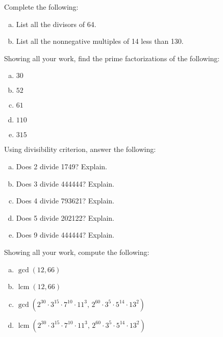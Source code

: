 \documentclass[11pt,letterpaper]{article}
\DeclareMathOperator{\lcm}{lcm}
\begin{document}

 Complete the following:
	\begin{enumerate}[(a)]
	\item List all the divisors of 64.
	\item List all the nonnegative multiples of 14 less than 130. 
	\end{enumerate}



\newpage



 Showing all your work, find the prime factorizations of the following:
	\begin{enumerate}[(a)]
	\item $30$
	\item $52$
	\item $61$
	\item $110$
	\item $315$
	\end{enumerate}



\newpage



 Using divisibility criterion, answer the following:
	\begin{enumerate}[(a)]
	\item Does 2 divide 1749? Explain.
	\item Does 3 divide 444444? Explain.
	\item Does 4 divide 793621? Explain.
	\item Does 5 divide 202122? Explain.
	\item Does 9 divide 444444? Explain. 
	\end{enumerate}



\newpage



 Showing all your work, compute the following:
	\begin{enumerate}[(a)]
	\item $\gcd(12, 66)$
	\item $\lcm(12, 66)$
	\item $\gcd(2^{30} \cdot 3^{15} \cdot 7^{10} \cdot 11^3,\, 2^{60} \cdot 3^{5} \cdot 5^{14} \cdot 13^2)$
	\item $\lcm(2^{30} \cdot 3^{15} \cdot 7^{10} \cdot 11^3,\, 2^{60} \cdot 3^{5} \cdot 5^{14} \cdot 13^2)$
	\end{enumerate} 
\end{document}
